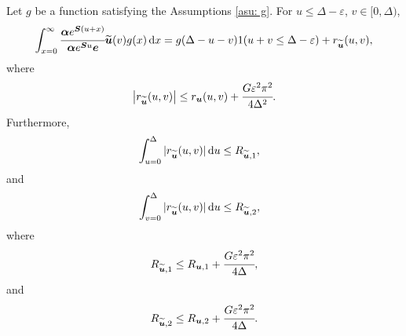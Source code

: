 
\begin{cor}\label{cor: cond bnd 2 U2}
	Let \(g\) be a function satisfying the Assumptions \ref{asu: g}. For \(u\leq \Delta-\varepsilon \), \(v\in[ 0,\Delta)\), 
	\[\int_{x=0}^\infty \cfrac{\boldsymbol \alpha  e^{\boldsymbol{S} (u+x)} }{\boldsymbol \alpha  e^{\boldsymbol{S} u} \boldsymbol e} \widetilde{\boldsymbol u}(v)g(x)\, \mathrm{d} x = g(\Delta-u-v) 1(u+v\leq\Delta-\varepsilon) + r_{\widetilde{\boldsymbol u}} (u,v),\]
	where 
	\[\left|r_{\widetilde{\boldsymbol u}} (u,v)\right|\leq r_{\boldsymbol u} (u,v) + \cfrac{G \varepsilon^2 \pi^2}{4\Delta^2}.\]
	Furthermore,  
	\begin{align*}
		&\int_{u=0}^{\Delta}| r_{\widetilde{\boldsymbol u}}(u,v)|\, \mathrm{d} u
		\leq R_{{\widetilde{\boldsymbol u}},1},
	\end{align*}
	and
	\begin{align*}
		&\int_{v=0}^{\Delta}| r_{\widetilde{\boldsymbol u}}(u,v)|\, \mathrm{d} u
		\leq R_{{\widetilde{\boldsymbol u}},2},
	\end{align*}
	where 
	\[R_{{\widetilde{\boldsymbol u}},1} \leq R_{{{\boldsymbol u}},1} + \cfrac{G \varepsilon^2 \pi^2}{4\Delta},\]
	and
	\[R_{{\widetilde{\boldsymbol u}},2} \leq R_{{{\boldsymbol u}},2} + \cfrac{G \varepsilon^2 \pi^2}{4\Delta}.\]
\end{cor}
